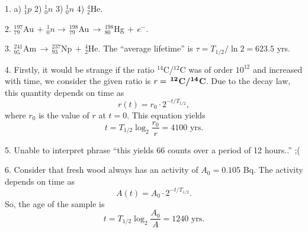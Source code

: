 \documentclass[14pt,a4paper,pdflatex]{disser}
\begin{document}
1. a) $^1_1 p$ \hspace{3cm} 2) $^1_0 n$ \hspace{3cm} 3) $^1_0 n$ \hspace{3cm} 4) $^4_2$He.

2. $^{197}_{79}$Au$\,+\,^1_0 n \to\,^{198}_{79}$Au$\,\to\,^{198}_{80}$Hg$\,+\,e^-$.

3. $^{241}_{95}$Am$\,\to\,^{237}_{93}$Np$\,+\,^4_2$He. The ``average lifetime'' is $\tau=T_{1/2}/\ln2=623.5$ yrs.

4. Firstly, it would be strange if the ratio $^{14}$C/$^{12}$C was of order $10^{12}$ and increased with time, we consider the given ratio is \textbf{$r=\,^{\bf{12}}$C/$^{\bf{14}}$C}. Due to the decay law, this quantity depends on time as
$$
  r(t)=r_0 \cdot2^{-t/T_{1/2}},
$$
where $r_0$ is the value of $r$ at $t=0$. This equation yields
$$
  t=T_{1/2}\log_2\frac{r_0}{r}=4100 \text{ yrs}.
$$

5. Unable to interpret phrase ``this yields 66 counts over a period of 12 hours..'' ;(

6. Consider that fresh wood always has an activity of $A_0=0.105$ Bq. The activity depends on time as
$$
  A(t)=A_0 \cdot 2^{-t/T_{1/2}}.
$$
So, the age of the sample is
$$
  t=T_{1/2}\log_2\frac{A_0}{A}=1240 \text{ yrs}.
$$
\end{document}
